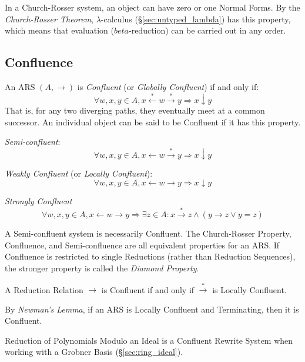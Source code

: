 In a Church-Rosser system, an object can have zero or one Normal
Forms. By the \emph{Church-Rosser Theorem}, $\lambda$-calculus
(\S\ref{sec:untyped_lambda}) has this property, which means that
evaluation ($beta$-reduction) can be carried out in any order.



\subsection{Confluence}\label{sec:rewrite_confluence}

An ARS $(A, \rightarrow)$ is \emph{Confluent} (or \emph{Globally
  Confluent}) if and only if:
\[
    \forall w,x,y \in A,
    x \stackrel{*}\leftarrow w \stackrel{*}\rightarrow y
    \Rightarrow x \downarrow y
\]
That is, for any two diverging paths, they eventually meet at a common
successor. An individual object can be said to be Confluent if it has
this property.

\emph{Semi-confluent}:
\[
    \forall w,x,y \in A,
    x \leftarrow w \stackrel{*}\rightarrow y
    \Rightarrow x \downarrow y
\]

\emph{Weakly Confluent} (or \emph{Locally Confluent}):
\[
    \forall w,x,y \in A,
    x \leftarrow w \rightarrow y \Rightarrow x \downarrow y
\]

\emph{Strongly Confluent}
\[
    \forall w,x,y \in A,
    x \leftarrow w \rightarrow y \Rightarrow
    \exists z \in A : x \stackrel{*}\rightarrow z \wedge
    (y \rightarrow z \vee y = z)
\]

A Semi-confluent system is necessarily Confluent. The Church-Rosser
Property, Confluence, and Semi-confluence are all equivalent
properties for an ARS. If Confluence is restricted to single
Reductions (rather than Reduction Sequences), the stronger property is
called the \emph{Diamond Property}.

A Reduction Relation $\rightarrow$ is Confluent if and only if
$\stackrel{*}\rightarrow$ is Locally Confluent.

By \emph{Newman's Lemma}, if an ARS is Locally Confluent and
Terminating, then it is Confluent.

Reduction of Polynomials Modulo an Ideal is a Confluent Rewrite System
when working with a Grobner Basis (\S\ref{sec:ring_ideal}).



